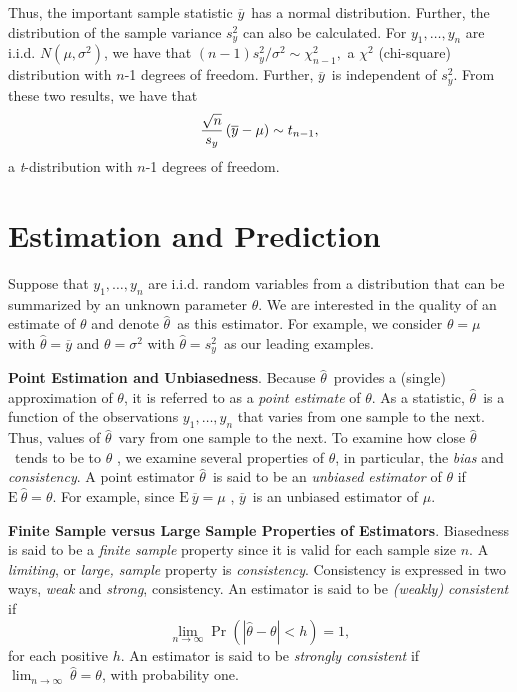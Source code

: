 Thus, the important sample statistic $\overline{y}$\ has a normal
distribution. Further, the distribution of the sample variance
$s_y^2$ can also be calculated. For $y_1,\ldots,y_n$ are i.i.d.
$N(\mu ,\sigma ^2) $, we have that $\left( n-1\right) s_y^2 /
\sigma^2\sim \chi_{n-1}^2, $ a $\chi ^2$ (chi-square) distribution
with $n$-1 degrees of freedom. Further, $\overline{y}$\ is
independent of $s_y^2$. From these two results, we have that
\begin{equation*}\index{distributions!chi-square}
\frac{\sqrt{n}}{s_y}\left( \overline{y}-\mu \right) \sim t_{n-1},
\end{equation*}
a \textit{t}-distribution with $n$-1 degrees of
freedom.

\section{Estimation and Prediction}

Suppose that $y_1,\ldots,y_n$ are i.i.d. random variables from a
distribution that can be summarized by an unknown parameter $\theta
$. We are interested in the quality of an estimate of $\theta $ and
denote $ \widehat{\theta }$\ as this estimator. For example, we
consider $\theta =\mu $ with $\widehat{\theta }=\overline{y}$ and
$\theta =\sigma ^2$ with $ \widehat{\theta }=s_y^2$\ as our leading
examples.


\textbf{Point Estimation and Unbiasedness}. Because $\widehat{\theta
}$\ provides a (single) approximation of $\theta $, it is referred
to as a \emph{point estimate} of $\theta $. As a statistic,
$\widehat{\theta }$\ is a function of the observations
$y_1,\ldots,y_n$ that varies from one sample to the next. Thus,
values of $\widehat{\theta }$\ vary from one sample to the next. To
examine how close $\widehat{\theta }$\ tends to be to $\theta $ , we
examine several properties of $\widehat{\theta }$, in particular,
the \emph{bias} and \emph{consistency}. A point estimator
$\widehat{\theta }$\ is said to be an \emph{unbiased estimator} of
$\theta $ if $\mathrm{E~} \widehat{\theta }=\theta $. For example,
since $\mathrm{E~}\overline{y}=\mu $ , $\overline{y}$\ is an
unbiased estimator of $\mu $.

\textbf{Finite Sample versus Large Sample Properties of Estimators}.
Biasedness is said to be a \emph{finite sample} property since it is
valid for each sample size $n$. A \emph{limiting}, or \emph{large,
sample} property is \emph{consistency}. Consistency is expressed in
two ways, \emph{weak} and \emph{strong}, consistency. An estimator
is said to be \emph{(weakly) consistent} if
\begin{equation*}
\lim_{n\rightarrow \infty }\Pr \left( |\widehat{\theta }-\theta |<h\right)
=1,
\end{equation*}
for each positive $h$. An estimator is said to be \emph{strongly consistent}
if $\lim_{n\rightarrow \infty }~\widehat{\theta }=\theta $, with probability
one.

